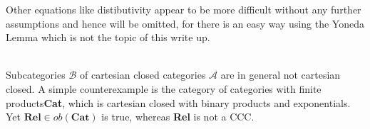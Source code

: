 Other equations like distibutivity appear to be more difficult without any further assumptions and hence will be omitted, for there is an easy way using the Yoneda Lemma which is not the topic of this write up.

\\
Subcategories $\mathcal{B}$ of cartesian closed categories $\mathcal{A}$ are in general not cartesian closed.
A simple counterexample is the category of categories with finite products\textbf{Cat}, which is cartesian closed with binary products and exponentials. 
Yet $\textbf{Rel} \in ob(\textbf{Cat})$ is true, whereas \textbf{Rel} is not a CCC. 






